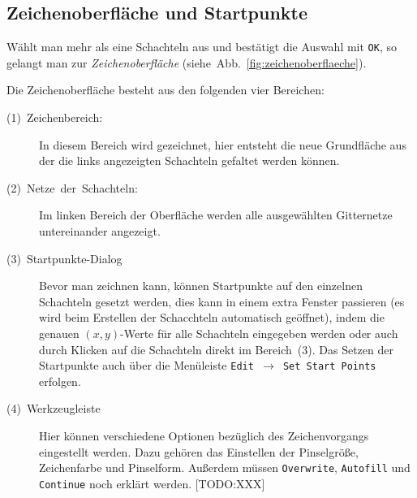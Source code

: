 \subsection{Zeichenoberfläche und Startpunkte}
\label{subsec:zeichenoberflaeche}

Wählt man mehr als eine Schachteln aus und bestätigt die Auswahl mit \texttt{OK}, so gelangt man zur \emph{Zeichenoberfläche} (siehe~Abb.~\ref{fig:zeichenoberflaeche}). 

Die Zeichenoberfläche besteht aus den folgenden vier Bereichen:

  \begin{description}
    \item [{(1)~Zeichenbereich:}] In diesem Bereich wird gezeichnet, hier     entsteht die neue Grundfläche aus der die links angezeigten Schachteln   gefaltet werden können.
    \item [(2)~Netze~der~Schachteln:] Im linken Bereich der Oberfläche werden alle ausgewählten Gitternetze untereinander angezeigt.
    \item [(3)~Startpunkte-Dialog] Bevor man zeichnen kann, können Startpunkte auf den einzelnen Schachteln gesetzt werden, dies kann in einem extra Fenster passieren (es wird beim Erstellen der Schacchteln automatisch geöffnet), indem die genauen $(x,y)$-Werte für alle Schachteln eingegeben werden oder auch durch Klicken auf die Schachteln direkt im Bereich~(3). Das Setzen der Startpunkte auch über die Menüleiste \texttt{Edit $\rightarrow$ Set Start Points} erfolgen.
    \item [(4)~Werkzeugleiste] Hier können verschiedene Optionen bezüglich des Zeichenvorgangs eingestellt werden. Dazu gehören das Einstellen der Pinselgröße, Zeichenfarbe und Pinselform. Außerdem müssen \texttt{Overwrite}, \texttt{Autofill} und \texttt{Continue} noch erklärt werden. [TODO:XXX]
  \end{description}

